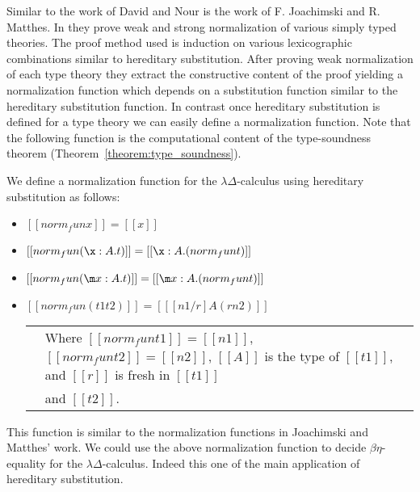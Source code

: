 Similar to the work of David and Nour is the work of F. Joachimski and
R. Matthes.  In \cite{Joachimski:1999} they prove weak and strong
normalization of various simply typed theories.  The proof method used
is induction on various lexicographic combinations similar to
hereditary substitution.  After proving weak normalization of each
type theory they extract the constructive content of the proof
yielding a normalization function which depends on a substitution
function similar to the hereditary substitution function.  In contrast
once hereditary substitution is defined for a type theory we can easily
define a normalization function. Note that the following function is 
the computational content of the type-soundness theorem 
(Theorem~\ref{theorem:type_soundness}).
\begin{definition}
  \label{def:norm_fun_hs}
  We define a normalization function for the $\lambda\Delta$-calculus using hereditary
  substitution as follows:
  \begin{center}
    \begin{itemize}
    \item[] $[[ norm_fun x ]] = [[x]]$\\
    \item[] $[[norm_fun (\x:A.t)]] = [[\x:A.(norm_fun t)]]$\\
    \item[] $[[norm_fun (\m x:A.t)]] = [[\m x:A.(norm_fun t)]]$\\
    \item[] $[[norm_fun (t1 t2)]] = [[ [n1/r] A (r n2)]]$\\
      \begin{tabular}{lll}
      & Where $[[norm_fun t1]] = [[n1]]$, $[[norm_fun t2]] = [[n2]]$, $[[A]]$ is
      the type of $[[t1]]$, and $[[r]]$ is fresh in $[[t1]]$\\
      &  and $[[t2]]$.\\
    \end{tabular}
    \end{itemize}
  \end{center}
\end{definition}

This function is similar to the normalization functions in Joachimski 
and Matthes' work.  We could use the above normalization function to
decide $\beta\eta$-equality for the $\lambda\Delta$-calculus.  Indeed
this one of the main application of hereditary substitution.

